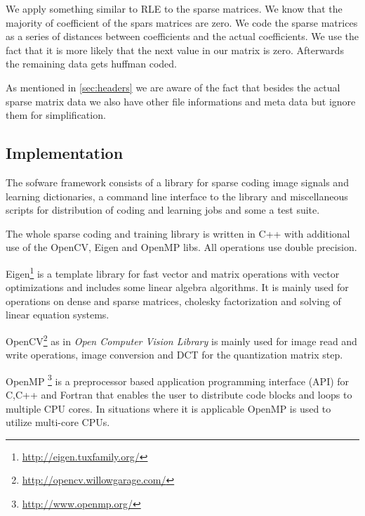 We apply something similar to RLE to the sparse matrices. We know that the
majority of coefficient of the spars matrices are zero. We code the sparse
matrices as a series of distances between coefficients and the actual
coefficients. We use the fact that it is more likely that the next value in our
matrix is zero. Afterwards the remaining data gets huffman coded.

As mentioned in \ref{sec:headers} we are aware of the fact that besides
the actual sparse matrix data we also have other file informations and meta
data but ignore them for simplification.
  
\subsection{Implementation}
The sofware framework consists of a library for sparse coding image signals 
and learning dictionaries, a command line interface to the library and
miscellaneous scripts for distribution of coding and learning jobs and
some a test suite.

The whole sparse coding and training library is written in C++ with
additional use of the OpenCV, Eigen and OpenMP libs. All operations use double
precision. 

Eigen\footnote{\url{http://eigen.tuxfamily.org/}}
is a template library for fast vector and matrix operations with vector
optimizations and includes some linear algebra algorithms. It is mainly used for
operations on dense and sparse matrices, cholesky factorization and solving of
linear equation systems. 

OpenCV\footnote{\url{http://opencv.willowgarage.com/}} as
in \emph{Open Computer Vision Library} is mainly used for
image read and write operations, image conversion and DCT for the
quantization matrix step. 

OpenMP \footnote{\url{http://www.openmp.org/}} is a preprocessor
based application programming interface (API) for C,C++ and Fortran that enables
the user to distribute code blocks and loops to multiple CPU cores. In
situations where it is applicable OpenMP is used to utilize multi-core CPUs. 




